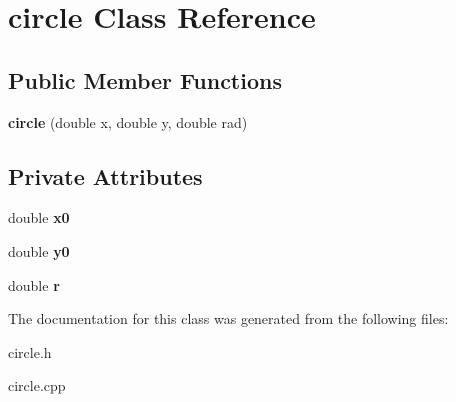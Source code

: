\hypertarget{classcircle}{}\section{circle Class Reference}
\label{classcircle}
\subsection*{Public Member Functions}
\begin{DoxyCompactItemize}
\item 
\mbox{\label{classcircle_a0a7895011a68519c1d3dd414ea2877e5}} 
{\bfseries circle} (double x, double y, double rad)
\end{DoxyCompactItemize}
\subsection*{Private Attributes}
\begin{DoxyCompactItemize}
\item 
\mbox{\label{classcircle_a3934aec6524a4e3b74d2534c99df9864}} 
double {\bfseries x0}
\item 
\mbox{\label{classcircle_a553f975d0d74316e3286c748b604d651}} 
double {\bfseries y0}
\item 
\mbox{\label{classcircle_a5f252f6cf93b81949dbf334c74931f18}} 
double {\bfseries r}
\end{DoxyCompactItemize}


The documentation for this class was generated from the following files\+:\begin{DoxyCompactItemize}
\item 
circle.\+h\item 
circle.\+cpp\end{DoxyCompactItemize}
